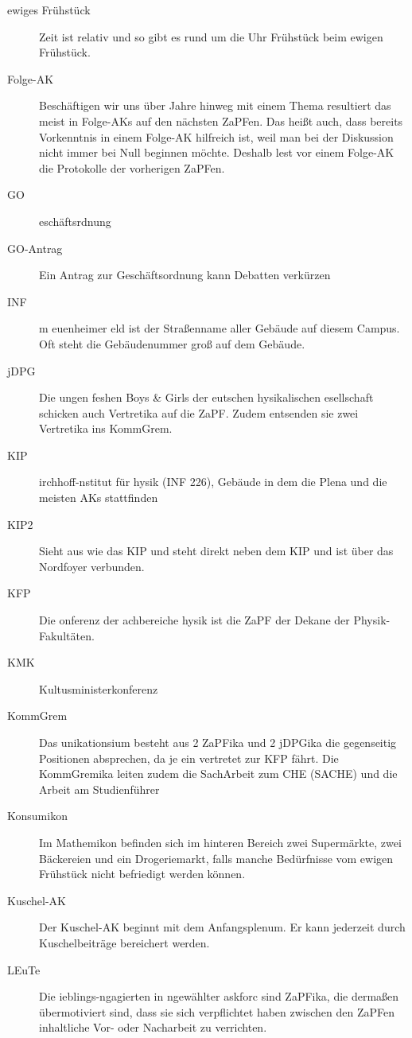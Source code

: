 \begin{description}
	\item[ewiges Frühstück] Zeit ist relativ und so gibt es rund um die Uhr Frühstück beim ewigen Frühstück.
	\item[Folge-AK] Beschäftigen wir uns über Jahre hinweg mit einem Thema resultiert das meist in Folge-AKs auf den nächsten ZaPFen. Das heißt auch, dass bereits Vorkenntnis in einem Folge-AK hilfreich ist, weil man bei der Diskussion nicht immer bei Null beginnen möchte. Deshalb lest vor einem Folge-AK die Protokolle der vorherigen ZaPFen.
	\item[GO] eschäftsrdnung
	\item[GO-Antrag] Ein Antrag zur Geschäftsordnung kann Debatten verkürzen
	\item[INF] m euenheimer eld ist der Straßenname aller Gebäude auf diesem Campus. Oft steht die Gebäudenummer groß auf dem Gebäude.
	\item[jDPG] Die ungen feshen Boys \& Girls der eutschen hysikalischen esellschaft schicken auch Vertretika auf die ZaPF. Zudem entsenden sie zwei Vertretika ins KommGrem.
	\item[KIP] irchhoff-nstitut für hysik (INF 226), Gebäude in dem die Plena und die meisten AKs stattfinden 
	\item[KIP2] Sieht aus wie das KIP und steht direkt neben dem KIP und ist über das Nordfoyer verbunden.
	\item[KFP] Die onferenz der achbereiche hysik ist die ZaPF der Dekane der Physik-Fakultäten.
	\item[KMK] Kultusministerkonferenz
	\item[KommGrem] Das unikationsium besteht aus 2 ZaPFika und 2 jDPGika die gegenseitig Positionen absprechen, da je ein vertretet zur KFP fährt. Die KommGremika leiten zudem die SachArbeit zum CHE (SACHE) und die Arbeit am Studienführer
	\item[Konsumikon] Im Mathemikon befinden sich im hinteren Bereich zwei Supermärkte, zwei Bäckereien und ein Drogeriemarkt, falls manche Bedürfnisse vom ewigen Frühstück nicht befriedigt werden können.
	\item[Kuschel-AK] Der Kuschel-AK beginnt mit dem Anfangsplenum. Er kann jederzeit durch Kuschelbeiträge bereichert werden.
	\item[LEuTe] Die ieblings-ngagierten in ngewählter askforc sind ZaPFika, die dermaßen übermotiviert sind, dass sie sich verpflichtet haben zwischen den ZaPFen inhaltliche Vor- oder Nacharbeit zu verrichten.

\end{description}
